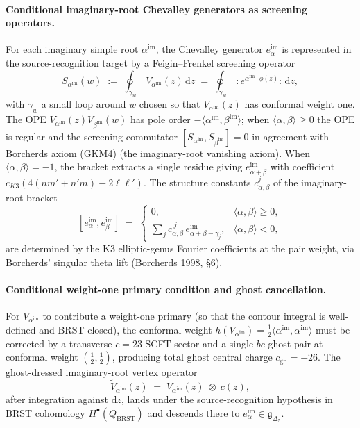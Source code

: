 \paragraph{Conditional imaginary-root Chevalley generators as screening operators.}
For each imaginary simple root $\alpha^{\mathrm{im}}$, the Chevalley
generator $e^{\mathrm{im}}_\alpha$ is represented in the
source-recognition target by a Feigin--Frenkel screening operator
\begin{equation}
\label{eq:voa-imag-root-screening}
  S_{\alpha^{\mathrm{im}}}(w) \;:=\; \oint_{\gamma_w}\,V_{\alpha^{\mathrm{im}}}(z)\,\mathrm{d}z
  \;=\; \oint_{\gamma_w}\,{:}e^{\alpha^{\mathrm{im}}\cdot\phi(z)}{:}\,\mathrm{d}z,
\end{equation}
with $\gamma_w$ a small loop around $w$ chosen so that
$V_{\alpha^{\mathrm{im}}}(z)$ has conformal weight one. The OPE
$V_{\alpha^{\mathrm{im}}}(z)V_{\beta^{\mathrm{im}}}(w)$ has pole order
$-\langle\alpha^{\mathrm{im}},\beta^{\mathrm{im}}\rangle$; when
$\langle\alpha,\beta\rangle \geq 0$ the OPE is regular and the screening
commutator
$[S_{\alpha^{\mathrm{im}}}, S_{\beta^{\mathrm{im}}}] = 0$ in agreement
with Borcherds axiom (GKM4) (the imaginary-root vanishing axiom).
When $\langle\alpha,\beta\rangle = -1$, the bracket extracts a single
residue giving $e^{\mathrm{im}}_{\alpha+\beta}$ with coefficient
$c_{K3}(4(nm' + n'm) - 2\ell\ell')$. The structure constants
$c_{\alpha,\beta}^j$ of the imaginary-root bracket
\begin{equation}
\label{eq:voa-imag-bracket}
  [e^{\mathrm{im}}_\alpha, e^{\mathrm{im}}_\beta] \;=\; \begin{cases}
    0, & \langle\alpha,\beta\rangle \geq 0, \\
    \sum_j c_{\alpha,\beta}^{\;j}\,e^{\mathrm{im}}_{\alpha+\beta - \gamma_j}, & \langle\alpha,\beta\rangle < 0,
  \end{cases}
\end{equation}
are determined by the K3 elliptic-genus Fourier coefficients at the
pair weight, via Borcherds' singular theta lift (Borcherds 1998,
\S6).

\paragraph{Conditional weight-one primary condition and ghost cancellation.}
For $V_{\alpha^{\mathrm{im}}}$ to contribute a weight-one primary
(so that the contour integral is well-defined and BRST-closed), the
conformal weight
$h(V_{\alpha^{\mathrm{im}}}) = \tfrac{1}{2}\langle\alpha^{\mathrm{im}},\alpha^{\mathrm{im}}\rangle$
must be corrected by a transverse $c = 23$ SCFT sector and a single
$bc$-ghost pair at conformal weight $(\tfrac{1}{2},\tfrac{1}{2})$,
producing total ghost central charge $c_{\mathrm{gh}} = -26$. The
ghost-dressed imaginary-root vertex operator
\begin{equation}
\label{eq:voa-ghost-dressed}
  \tilde V_{\alpha^{\mathrm{im}}}(z) \;=\; V_{\alpha^{\mathrm{im}}}(z) \;\otimes\; c(z),
\end{equation}
after integration against $\mathrm{d}z$, lands under the
source-recognition hypothesis in BRST cohomology
$H^\bullet(Q_{\mathrm{BRST}})$ and descends there to
$e^{\mathrm{im}}_\alpha \in \mathfrak g_{\Delta_5}$.

